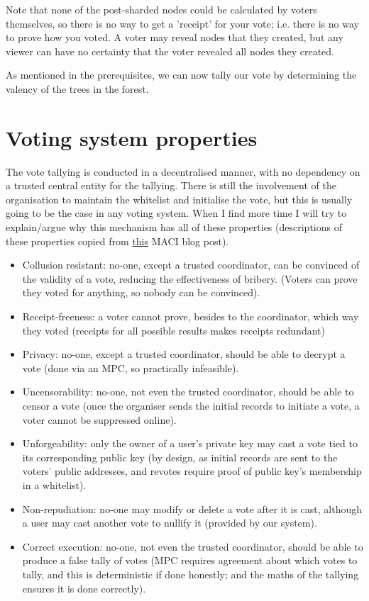 \documentclass{article}
\begin{document}
Note that none of the post-sharded nodes could be calculated by voters themselves, so there is no way to get a 'receipt' for your vote; i.e. there is no way to prove how you voted. A voter may reveal nodes that they created, but any viewer can have no certainty that the voter revealed all nodes they created.

As mentioned in the prerequisites, we can now tally our vote by determining the valency of the trees in the forest.

\section{Voting system properties}
The vote tallying is conducted in a decentralised manner, with no dependency on a trusted central entity for the tallying. There is still the involvement of the organisation to maintain the whitelist and initialise the vote, but this is usually going to be the case in any voting system.
When I find more time I will try to explain/argue why this mechanism has all of these properties (descriptions of these properties copied from \hyperlink{https://medium.com/privacy-scaling-explorations/release-announcement-maci-1-0-c032bddd2157}{this} MACI blog post).
\begin{itemize}
    \item Collusion resistant: no-one, except a trusted coordinator, can be convinced of the validity of a vote, reducing the effectiveness of bribery. (Voters can prove they voted for anything, so nobody can be convinced).
    \item Receipt-freeness: a voter cannot prove, besides to the coordinator, which way they voted (receipts for all possible results makes receipts redundant)
    \item Privacy: no-one, except a trusted coordinator, should be able to decrypt a vote (done via an MPC, so practically infeasible).
    \item Uncensorability: no-one, not even the trusted coordinator, should be able to censor a vote (once the organiser sends the initial records to initiate a vote, a voter cannot be suppressed online).
    \item Unforgeability: only the owner of a user’s private key may cast a vote tied to its corresponding public key (by design, as initial records are sent to the voters' public addresses, and revotes require proof of public key's membership in a whitelist).
    \item Non-repudiation: no-one may modify or delete a vote after it is cast, although a user may cast another vote to nullify it (provided by our system).
    \item Correct execution: no-one, not even the trusted coordinator, should be able to produce a false tally of votes (MPC requires agreement about which votes to tally, and this is deterministic if done honestly; and the maths of the tallying ensures it is done correctly).
\end{itemize}
\end{document}
